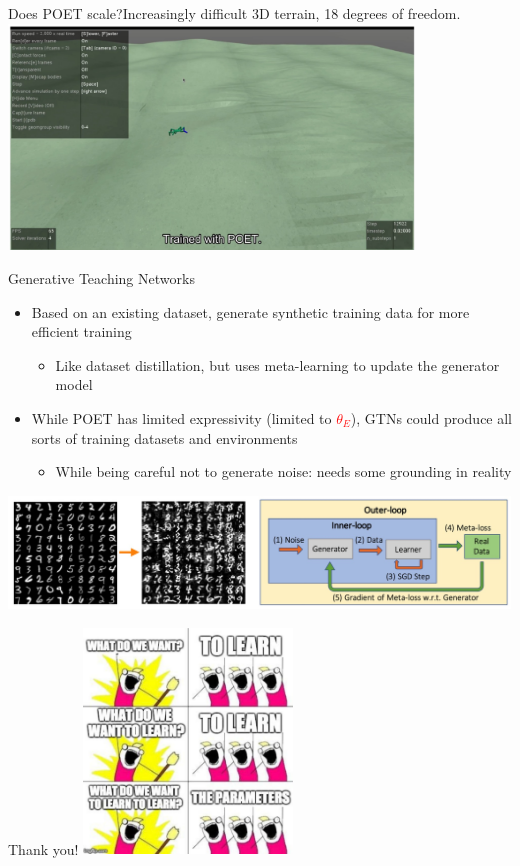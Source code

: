 \begin{frame}{Does POET scale?}{Increasingly difficult 3D terrain, 18 degrees of freedom.}
    \centering\includegraphics[height=6cm]{image/img015021.jpg}
\end{frame}

\begin{frame}{Generative Teaching Networks}
     \begin{itemize}
        \item Based on an existing dataset, generate synthetic training data for more efficient training
        \begin{itemize}
            \item Like dataset distillation, but uses meta-learning to update the generator model
        \end{itemize}
        \item While POET has limited expressivity (limited to \textcolor{red}{$\theta_E$}), GTNs could produce all sorts of training datasets and environments
        \begin{itemize}
            \item While being careful not to generate noise: needs some grounding in reality
        \end{itemize}
    \end{itemize}   
    \centering\includegraphics[height=3cm]{image/img015352.jpg}
    
\end{frame}
\begin{frame}{Thank you!}
    \centering\includegraphics[height=6cm]{image/Picture6.png}
\end{frame}

